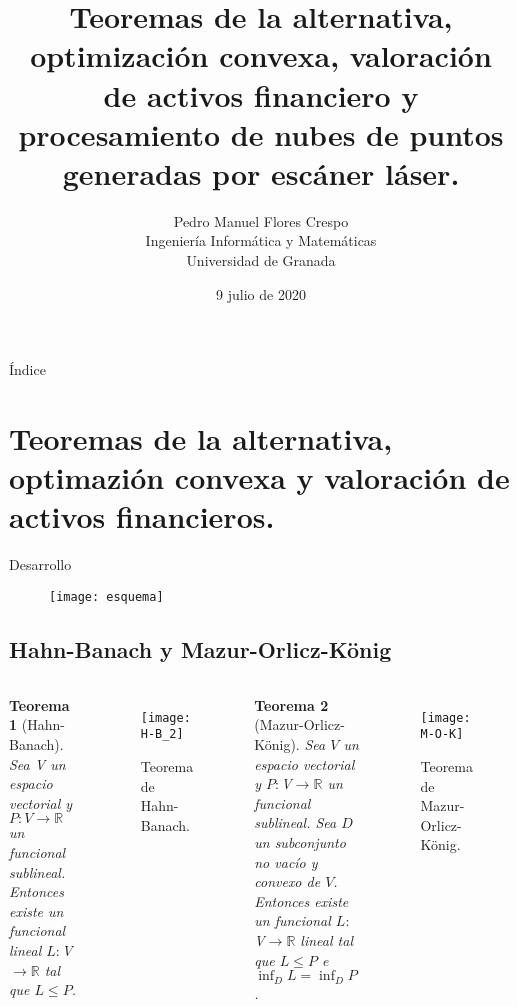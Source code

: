 \documentclass[9pt]{beamer}
\author[]{Pedro Manuel Flores Crespo  \\ \vspace{6mm} \small Ingeniería Informática y Matemáticas \\ \small Universidad de Granada}
\title[Trabajo Fin de Grado]{Teoremas de la alternativa, optimización convexa, valoración de activos financiero y procesamiento de nubes de puntos generadas por escáner láser.}
\date{9 julio de 2020}
\newtheorem{teorema}{Teorema}
\newcommand{\RR}{\mathbb{R}}
\newcommand{\vecSpace}{ $V$ }
\begin{document}
	
	\begin{frame}
		\maketitle
	\end{frame}

	\begin{frame}{Índice}
		\tableofcontents
	\end{frame}

	\section[Teoremas de la alternativa, optimazión convexa y valoración de activos financieros]{Teoremas de la alternativa, optimazión convexa y valoración de activos financieros.}

	\begin{frame}{Desarrollo}
	\begin{figure}[h!]
		\centering
		\texttt{[image: esquema]}
	\end{figure}
	\end{frame}


	\subsection{Hahn-Banach y Mazur-Orlicz-König}
		\begin{frame}[fragile]{}
			\begin{columns}
				\column{0.5\textwidth}
				\begin{teorema}[Hahn-Banach]
					Sea V un espacio vectorial y $P:V \rightarrow \RR$ un funcional sublineal. Entonces existe un funcional lineal $ L:\vecSpace \longrightarrow \RR $ tal que $ L \leq P $.
				\end{teorema}
			\begin{figure}[h!]
				\centering
				\texttt{[image: H-B\_2]}
				\caption{Teorema de Hahn-Banach.}
			\end{figure}
				\column{0.5\textwidth}
				\begin{teorema}[Mazur-Orlicz-König]
						Sea\vecSpace un espacio vectorial y $P:\vecSpace \rightarrow \RR$ un funcional sublineal.  Sea $ D $ un subconjunto no vacío y convexo de $ V $. Entonces existe un funcional $ L: \vecSpace \longrightarrow \RR $ lineal tal que $ L \leq P $ e $ \inf_D L = \inf_D P $.
				\end{teorema}
			\begin{figure}[h!]
				\centering
				\texttt{[image: M-O-K]}
				\caption{Teorema de Mazur-Orlicz-König.}
			\end{figure} 
			\end{columns}
		\end{frame}
\end{document}
